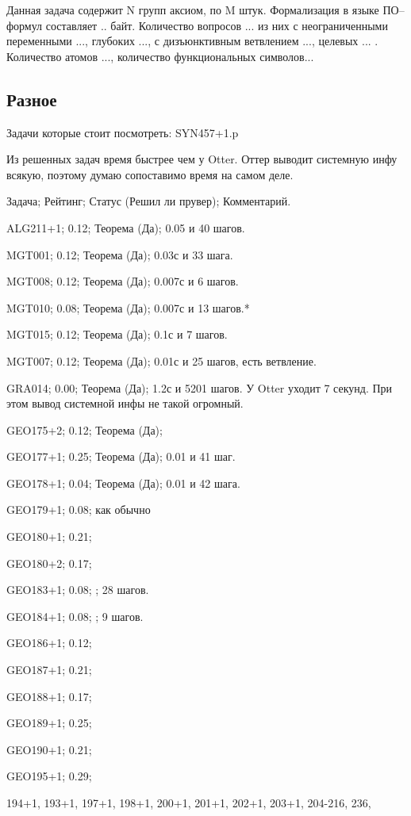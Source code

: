 Данная задача содержит N групп аксиом, по M штук. Формализация в языке ПО--формул составляет .. байт. Количество вопросов ... из них с неограниченными переменными ..., глубоких ..., с дизъюнктивным ветвлением ..., целевых ... . Количество атомов ..., количество функциональных символов... 


\subsection{Разное}
Задачи которые стоит посмотреть:
SYN457+1.p

Из решенных задач время быстрее чем у Otter. Оттер выводит системную инфу всякую, поэтому думаю сопоставимо время на самом деле.

Задача; Рейтинг; Статус (Решил ли прувер); Комментарий.

ALG211+1; 0.12; Теорема (Да); 0.05 и 40 шагов.

MGT001; 0.12; Теорема (Да); 0.03с и 33 шага.

MGT008; 0.12; Теорема (Да); 0.007с и 6 шагов.

MGT010; 0.08; Теорема (Да); 0.007с и 13 шагов.*

MGT015; 0.12; Теорема (Да); 0.1с и 7 шагов.

MGT007; 0.12; Теорема (Да); 0.01с и 25 шагов, есть ветвление.

GRA014; 0.00; Теорема (Да); 1.2с и 5201 шагов. У Otter уходит 7 секунд. При этом вывод системной инфы не такой огромный.

GEO175+2; 0.12; Теорема (Да);

GEO177+1; 0.25; Теорема (Да); 0.01 и 41 шаг.

GEO178+1; 0.04; Теорема (Да); 0.01 и 42 шага.

GEO179+1; 0.08; как обычно

GEO180+1; 0.21;

GEO180+2; 0.17;

GEO183+1; 0.08; ; 28 шагов.

GEO184+1; 0.08; ; 9 шагов.

GEO186+1; 0.12;

GEO187+1; 0.21;

GEO188+1; 0.17;

GEO189+1; 0.25;

GEO190+1; 0.21;

GEO195+1; 0.29;

194+1, 193+1, 197+1, 198+1, 200+1, 201+1, 202+1, 203+1, 204-216, 236,   

